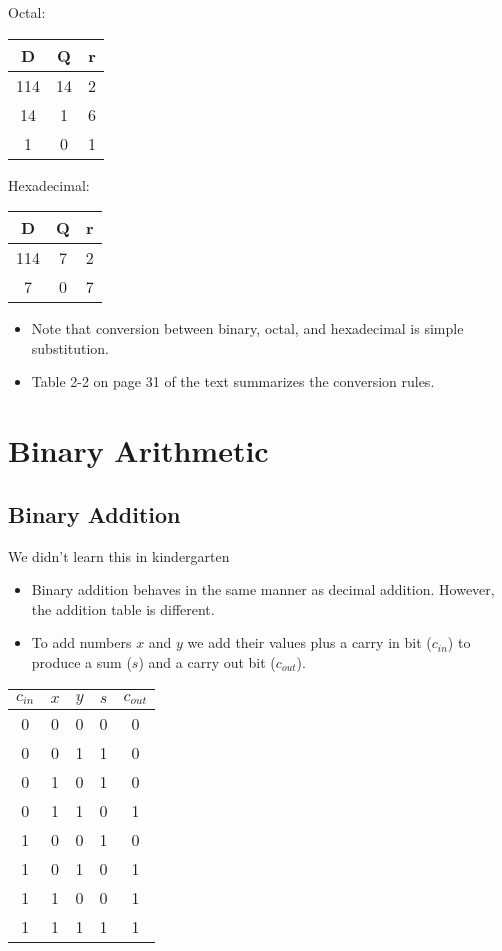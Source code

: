 Octal:

\begin{tabular}{c|cc}
  D & Q & r\\
  \hline
  114 & 14 & 2\\
  14 & 1 & 6\\
  1 & 0 & 1\\
\end{tabular}

Hexadecimal:

\begin{tabular}{c|cc}
  D & Q & r\\
  \hline
  114 & 7 & 2\\
  7 & 0 & 7\\
\end{tabular}

\begin{itemize}
  \item Note that conversion between binary, octal, and hexadecimal is simple substitution.
  \item Table 2-2 on page 31 of the text summarizes the conversion rules.
\end{itemize}

\section{Binary Arithmetic}

\subsection{Binary Addition}

\begin{frame}{We didn't learn this in kindergarten}
  \begin{itemize}
    \item Binary addition behaves in the same manner as decimal addition.  However, the addition table is different.
    \item To add numbers $x$ and $y$ we add their values plus a carry in bit ($c_{in}$) to produce a sum ($s$) and a carry out bit ($c_{out}$).
  \end{itemize}
  \begin{center}
      \begin{tabular}{ccc|cc}
        $c_{in}$ & $x$ & $y$ & $s$ & $c_{out}$\\
        \hline
        0 & 0 & 0 & 0 & 0 \\
        0 & 0 & 1 & 1 & 0 \\
        0 & 1 & 0 & 1 & 0 \\
        0 & 1 & 1 & 0 & 1 \\
        1 & 0 & 0 & 1 & 0 \\
        1 & 0 & 1 & 0 & 1 \\
        1 & 1 & 0 & 0 & 1 \\
        1 & 1 & 1 & 1 & 1 \\
      \end{tabular}
  \end{center}
\end{frame}

